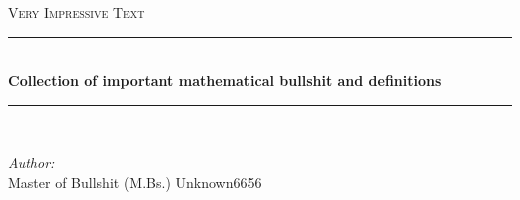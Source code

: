 \documentclass[pdftex,12pt,a4paper]{report}
\newcommand{\HRule}{\rule{\linewidth}{0.5mm}} %
\begin{document}
    \selectfont
    \begin{titlepage}
        \begin{center}
            \vspace*{180px}
            \textsc{\Large Very Impressive Text}\\[0.8cm]
            \HRule \\[0.4cm]
            {
                \Huge
                \bfseries
                Collection of important mathematical bullshit and definitions
                \\[0.4cm]
            }
            \HRule \\[1.5cm]
        \end{center}
        \noindent
        \begin{minipage}{0.7\textwidth}
            \begin{flushleft} \large
                \emph{Author:} \\
                Master of Bullshit (M.Bs.) Unknown6656
            \end{flushleft}
        \end{minipage}
    \end{titlepage}
    \newpage
    \setcounter{minitocdepth}{0}
    \dominitoc
    \tableofcontents
    \minitoc
    \newpage
    \setcounter{section}{0}
\end{document}
